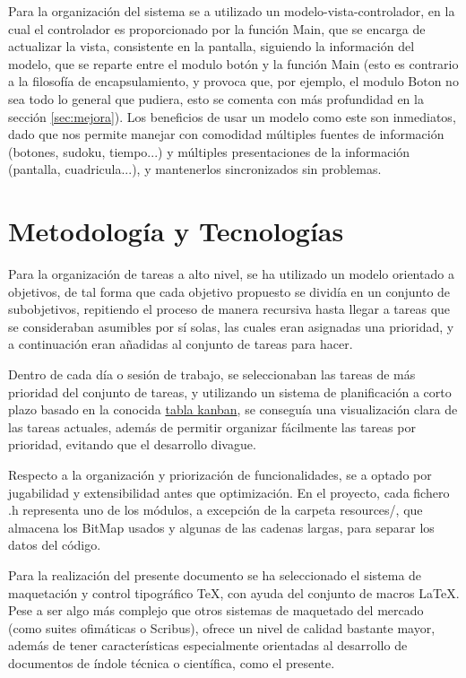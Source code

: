 \documentclass[12pt,letterpaper]{article}
\begin{document}
Para la organización del sistema se a utilizado un
modelo-vista-controlador, en la cual el controlador es proporcionado
por la función Main, que se encarga de actualizar la vista,
consistente en la pantalla, siguiendo la información del modelo, que
se reparte entre el modulo botón y la función Main (esto es contrario
a la filosofía de encapsulamiento, y provoca que, por ejemplo, el
modulo Boton no sea todo lo general que pudiera, esto se comenta con
más profundidad en la sección \ref{sec:mejora}). Los beneficios de
usar un modelo como este son inmediatos, dado que nos permite manejar
con comodidad múltiples fuentes de información (botones, sudoku,
tiempo...) y múltiples presentaciones de la información (pantalla,
cuadricula...), y mantenerlos sincronizados sin problemas.

\section{Metodología y Tecnologías}
\label{sec:metodologia-tecnologia}
Para la organización de tareas a alto nivel, se ha utilizado un modelo
orientado a objetivos, de tal forma que cada objetivo propuesto se
dividía en un conjunto de subobjetivos, repitiendo el proceso de
manera recursiva hasta llegar a tareas que se consideraban asumibles
por sí solas, las cuales eran asignadas una prioridad, y a
continuación eran añadidas al conjunto de tareas para hacer.

Dentro de cada día o sesión de trabajo, se seleccionaban las tareas de
más prioridad del conjunto de tareas, y utilizando un sistema de
planificación a corto plazo basado en la conocida
\href{https://en.wikipedia.org/wiki/Kanban\_board}{tabla kanban}, se
conseguía una visualización clara de las tareas actuales, además de
permitir organizar fácilmente las tareas por prioridad, evitando que
el desarrollo divague.

Respecto a la organización y priorización de funcionalidades, se a
optado por jugabilidad y extensibilidad antes que optimización. En el
proyecto, cada fichero .h representa uno de los módulos, a excepción
de la carpeta resources/, que almacena los BitMap usados y algunas de
las cadenas largas, para separar los datos del código.

Para la realización del presente documento se ha seleccionado el
sistema de maquetación y control tipográfico \TeX, con ayuda del
conjunto de macros \LaTeX. Pese a ser algo más complejo que otros
sistemas de maquetado del mercado (como suites ofimáticas o Scribus),
ofrece un nivel de calidad bastante mayor, además de tener
características especialmente orientadas al desarrollo de documentos
de índole técnica o científica, como el presente.
\end{document}
